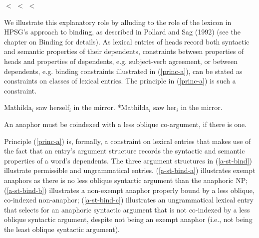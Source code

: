 \documentclass[output=paper]{langsci/langscibook}
\begin{document}
\begin{exe}
	\ex\label{obl-hier}  $<$  $<$  $<$ 
\end{exe}


We illustrate this explanatory role by alluding to the role of the lexicon in HPSG's approach to binding, as described in Pollard and Sag (1992) (see the chapter on Binding for details). As lexical entries of heads record both syntactic and semantic properties of their dependents, constraints between properties of heads and properties of dependents, e.g. subject-verb agreement, or between dependents, e.g. binding constraints illustrated in (\ref{princ-a}), can be stated as constraints on classes of lexical entries. The principle in (\ref{princ-a}) is such a constraint.

\begin{exe}
\ex\label{bind}\begin{xlist}
	\ex\label{bind-a} Mathilda$_{i}$ saw herself$_{i}$ in the mirror. 
	\ex\label{bind-b} *Mathilda$_{i}$ saw her$_{i}$ in the mirror. 
\end{xlist}	
\ex\label{princ-a}An anaphor must be coindexed with a less oblique co-argument, if there is one.
\end{exe}
                                   
Principle (\ref{princ-a}) is, formally, a constraint on lexical entries that makes use of the fact that an entry's argument structure records the syntactic and semantic properties of a word's dependents. The three argument structures in (\ref{a-st-bind}) illustrate permissible and ungrammatical entries. (\ref{a-st-bind-a}) illustrates exempt anaphors as there is no less oblique syntactic argument than the anaphoric NP; (\ref{a-st-bind-b}) illustrates a non-exempt anaphor properly bound by a less oblique, co-indexed non-anaphor; (\ref{a-st-bind-c}) illustrates an ungrammatical lexical entry that selects for an anaphoric syntactic argument that is not co-indexed by a less oblique syntactic argument, despite not being an exempt anaphor (i.e., not being the least oblique syntactic argument).

\eal
\label{a-st-bind}
\zl
\end{document}
